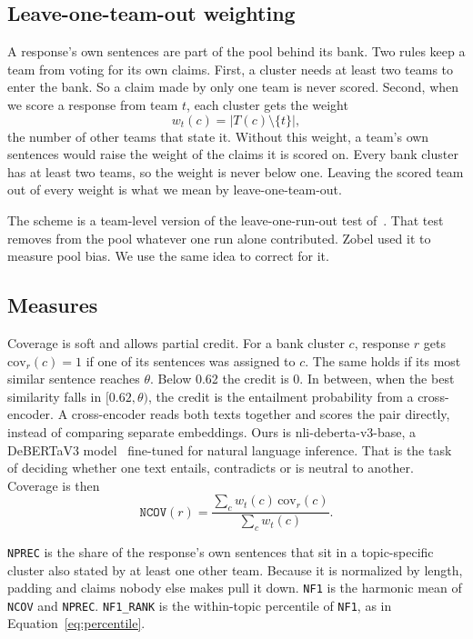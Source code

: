 \subsection{Leave-one-team-out weighting}

A response's own sentences are part of the pool behind its bank. Two
rules keep a team from voting for its own claims. First, a cluster needs at least
two teams to enter the bank. So a claim made by only one team is never scored.
Second, when we score a response from team $t$, each cluster gets the weight
\begin{equation}
  w_t(c) = |T(c) \setminus \{t\}|,
\end{equation}
the number of other teams that state it. Without this weight, a team's own
sentences would raise the weight of the claims it is scored on. Every bank
cluster has at least two teams, so the weight is never below one. Leaving the
scored team out of every weight is what we mean by leave-one-team-out.

The scheme is a team-level version of the leave-one-run-out test
of~\citet{zobel1998reliable}. That test removes from the pool whatever one run
alone contributed. Zobel used it to measure pool bias. We use the same idea to
correct for it.

\subsection{Measures}

Coverage is soft and allows partial credit. For a bank cluster $c$, response $r$
gets $\mathrm{cov}_r(c)=1$ if one of its sentences was assigned to $c$. The same
holds if its most similar sentence reaches $\theta$. Below 0.62 the credit is 0. In
between, when the best similarity falls in $[0.62, \theta)$, the credit is the
entailment probability from a cross-encoder. A cross-encoder reads both texts
together and scores the pair directly, instead of comparing separate embeddings.
Ours is nli-deberta-v3-base, a DeBERTaV3 model~\cite{he2023debertav3} fine-tuned
for natural language inference. That is the task of deciding whether one text
entails, contradicts or is neutral to another. Coverage is then
\begin{equation}
  \texttt{NCOV}(r) = \frac{\sum_{c} w_t(c)\,\mathrm{cov}_r(c)}{\sum_{c} w_t(c)}.
\end{equation}

\texttt{NPREC} is the share of the response's own sentences that sit in a
topic-specific cluster also stated by at least one other team. Because it is
normalized by length, padding and claims nobody else makes pull it down.
\texttt{NF1} is the harmonic mean of \texttt{NCOV} and \texttt{NPREC}.
\texttt{NF1\_RANK} is the within-topic percentile of \texttt{NF1}, as in
Equation~\ref{eq:percentile}. 

